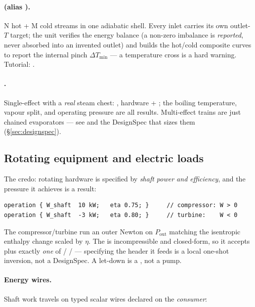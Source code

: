 \documentclass[11pt,a4paper]{article}
\begin{document}
\paragraph{ (alias ).}  N hot + M cold
streams in one adiabatic shell.  Every inlet carries its own outlet-$T$
target; the unit verifies the energy balance (a non-zero imbalance is
\emph{reported}, never absorbed into an invented outlet) and builds the
hot/cold composite curves to report the internal pinch
$\Delta T_{\min}$ --- a temperature cross is a hard warning.  Tutorial:
.

\paragraph{.}  Single-effect with a \emph{real} steam
chest: , hardware  + ;
the boiling temperature, vapour split, and operating pressure are all
results.  Multi-effect trains are just chained evaporators --- see
 and the DesignSpec that sizes
them (\S\ref{sec:designspec}).

\subsection{Rotating equipment and electric loads}\label{sec:rotating}

The credo: rotating hardware is specified by \emph{shaft power and
efficiency}, and the pressure it achieves is a result:

\begin{lstlisting}[language=dict]
operation { W_shaft  10 kW;   eta 0.75; }     // compressor: W > 0
operation { W_shaft  -3 kW;   eta 0.80; }     // turbine:    W < 0
\end{lstlisting}

The compressor/turbine run an outer Newton on $P_{\mathrm{out}}$
matching the isentropic enthalpy change scaled by $\eta$.  The
 is incompressible and closed-form, so it accepts 
plus exactly \emph{one} of  /  /
 --- specifying the header it feeds is a local one-shot
inversion, not a DesignSpec.  A let-down is a , not a pump.

\paragraph{Energy wires.}  Shaft work travels on typed scalar wires
declared on the \emph{consumer}:
\end{document}
